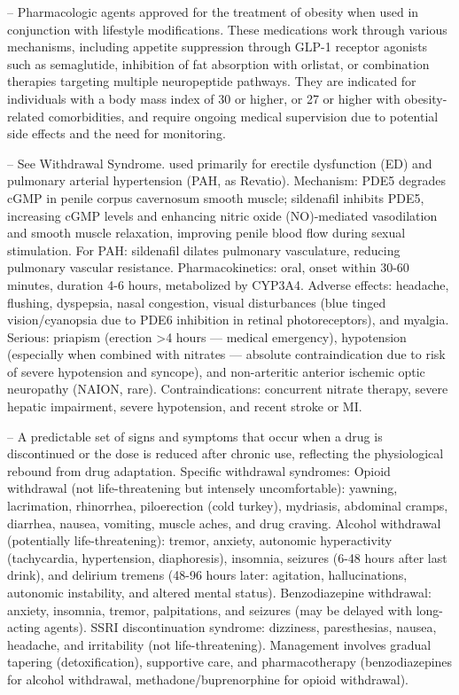 -- Pharmacologic agents approved for the treatment of obesity when used in conjunction with lifestyle modifications. These medications work through various mechanisms, including appetite suppression through GLP-1 receptor agonists such as semaglutide, inhibition of fat absorption with orlistat, or combination therapies targeting multiple neuropeptide pathways. They are indicated for individuals with a body mass index of 30 or higher, or 27 or higher with obesity-related comorbidities, and require ongoing medical supervision due to potential side effects and the need for monitoring.

-- See Withdrawal Syndrome. used primarily for erectile dysfunction (ED) and pulmonary arterial hypertension (PAH, as Revatio). Mechanism: PDE5 degrades cGMP in penile corpus cavernosum smooth muscle; sildenafil inhibits PDE5, increasing cGMP levels and enhancing nitric oxide (NO)-mediated vasodilation and smooth muscle relaxation, improving penile blood flow during sexual stimulation. For PAH: sildenafil dilates pulmonary vasculature, reducing pulmonary vascular resistance. Pharmacokinetics: oral, onset within 30-60 minutes, duration 4-6 hours, metabolized by CYP3A4. Adverse effects: headache, flushing, dyspepsia, nasal congestion, visual disturbances (blue tinged vision/cyanopsia due to PDE6 inhibition in retinal photoreceptors), and myalgia. Serious: priapism (erection >4 hours — medical emergency), hypotension (especially when combined with nitrates — absolute contraindication due to risk of severe hypotension and syncope), and non-arteritic anterior ischemic optic neuropathy (NAION, rare). Contraindications: concurrent nitrate therapy, severe hepatic impairment, severe hypotension, and recent stroke or MI.

-- A predictable set of signs and symptoms that occur when a drug is discontinued or the dose is reduced after chronic use, reflecting the physiological rebound from drug adaptation. Specific withdrawal syndromes: Opioid withdrawal (not life-threatening but intensely uncomfortable): yawning, lacrimation, rhinorrhea, piloerection (cold turkey), mydriasis, abdominal cramps, diarrhea, nausea, vomiting, muscle aches, and drug craving. Alcohol withdrawal (potentially life-threatening): tremor, anxiety, autonomic hyperactivity (tachycardia, hypertension, diaphoresis), insomnia, seizures (6-48 hours after last drink), and delirium tremens (48-96 hours later: agitation, hallucinations, autonomic instability, and altered mental status). Benzodiazepine withdrawal: anxiety, insomnia, tremor, palpitations, and seizures (may be delayed with long-acting agents). SSRI discontinuation syndrome: dizziness, paresthesias, nausea, headache, and irritability (not life-threatening). Management involves gradual tapering (detoxification), supportive care, and pharmacotherapy (benzodiazepines for alcohol withdrawal, methadone/buprenorphine for opioid withdrawal).

